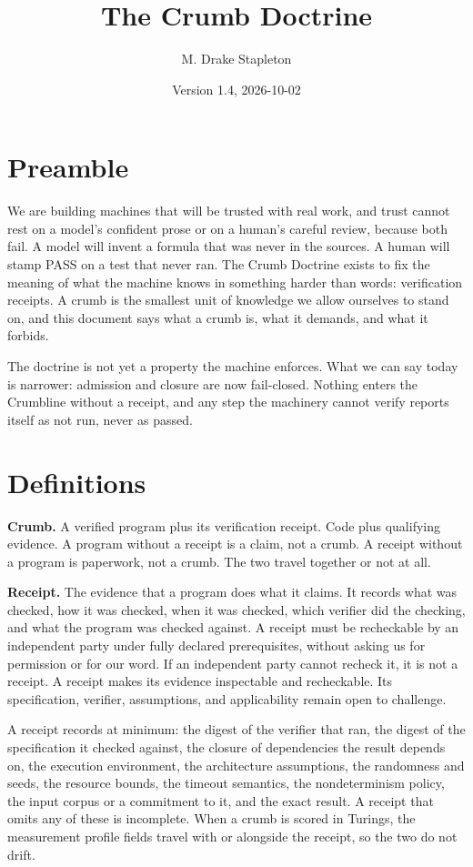 \documentclass[11pt]{article}
\title{The Crumb Doctrine}
\author{M. Drake Stapleton}
\date{Version 1.4, 2026-10-02}
\begin{document}
\maketitle

\section{Preamble}

We are building machines that will be trusted with real work, and trust cannot rest on a model's confident prose or on a human's careful review, because both fail. A model will invent a formula that was never in the sources. A human will stamp PASS on a test that never ran. The Crumb Doctrine exists to fix the meaning of what the machine knows in something harder than words: verification receipts. A crumb is the smallest unit of knowledge we allow ourselves to stand on, and this document says what a crumb is, what it demands, and what it forbids.

The doctrine is not yet a property the machine enforces. What we can say today is narrower: admission and closure are now fail-closed. Nothing enters the Crumbline without a receipt, and any step the machinery cannot verify reports itself as not run, never as passed.

\section{Definitions}

\textbf{Crumb.} A verified program plus its verification receipt. Code plus qualifying evidence. A program without a receipt is a claim, not a crumb. A receipt without a program is paperwork, not a crumb. The two travel together or not at all.

\textbf{Receipt.} The evidence that a program does what it claims. It records what was checked, how it was checked, when it was checked, which verifier did the checking, and what the program was checked against. A receipt must be recheckable by an independent party under fully declared prerequisites, without asking us for permission or for our word. If an independent party cannot recheck it, it is not a receipt. A receipt makes its evidence inspectable and recheckable. Its specification, verifier, assumptions, and applicability remain open to challenge.

A receipt records at minimum: the digest of the verifier that ran, the digest of the specification it checked against, the closure of dependencies the result depends on, the execution environment, the architecture assumptions, the randomness and seeds, the resource bounds, the timeout semantics, the nondeterminism policy, the input corpus or a commitment to it, and the exact result. A receipt that omits any of these is incomplete. When a crumb is scored in Turings, the measurement profile fields travel with or alongside the receipt, so the two do not drift.
\end{document}
